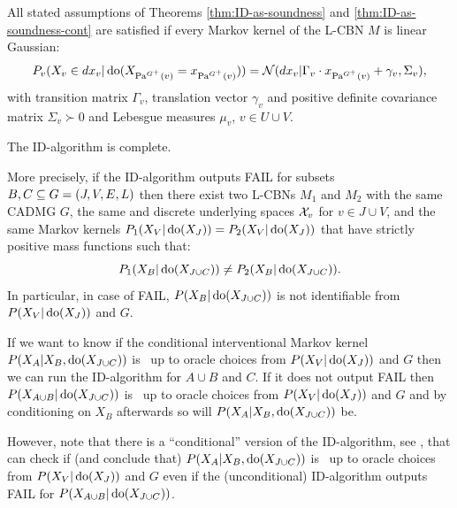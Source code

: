 \begin{Eg}
    All stated assumptions of Theorems \ref{thm:ID-as-soundness} and \ref{thm:ID-as-soundness-cont} 
    are satisfied if every Markov kernel of the L-CBN $M$ is linear Gaussian: 
    \[P_v(X_v \in dx_v|\operatorname{do}(X_{\mathrm{Pa}^{G^+}(v)}=x_{\mathrm{Pa}^{G^+}(v)})) = \mathcal{N}(dx_v|\Gamma_v \cdot x_{\mathrm{Pa}^{G^+}(v)} + \gamma_v, \Sigma_v), \] 
    with transition matrix $\Gamma_v$, translation vector $\gamma_v$ and positive definite covariance matrix $\Sigma_v \succ 0$ and Lebesgue measures $\mu_v$, $v \in U \cup V$.
\end{Eg}

\begin{Thm} 
    The ID-algorithm is complete.

    More precisely, if the ID-algorithm outputs FAIL for subsets $B, C \subseteq G=(J,V,E,L)$ 
    then there exist two L-CBNs $M_1$ and $M_2$ with the same \observational CADMG
    $G$, the same and discrete underlying spaces $\mathcal{X}_v$ for $v \in J \cup V$, and the same 
    \observational Markov kernels $P_1(X_V|\operatorname{do}(X_J)) =P_2(X_V|\operatorname{do}(X_J))$ that have strictly positive mass functions such that:
    \[ P_1(X_B|\operatorname{do}(X_{J \cup C})) \neq P_2(X_B|\operatorname{do}(X_{J \cup C})). \]
    In particular, in case of FAIL, $P(X_B|\operatorname{do}(X_{J \cup C}))$ is not identifiable from $P(X_V|\operatorname{do}(X_J))$ and $G$.
\end{Thm}


\begin{Rem} 
    If we want to know if the conditional interventional Markov kernel $P(X_A|X_B,\operatorname{do}(X_{J \cup C}))$
    is \trackable\ up to oracle choices from $P(X_V|\operatorname{do}(X_J))$ and $G$ then we can run the ID-algorithm
    for $A \cup B$ and $C$. If it does not output FAIL then $P(X_{A \cup B}|\operatorname{do}(X_{J \cup C}))$ 
    is \trackable\ up to oracle choices from $P(X_V|\operatorname{do}(X_J))$ and $G$ and by conditioning on $X_B$ afterwards so will 
    $P(X_A|X_B,\operatorname{do}(X_{J \cup C}))$ be.

    However, note that there is a ``conditional'' version of the ID-algorithm, see \cite{Tian04s}, 
    that can check if (and conclude that)
    $P(X_A|X_B,\operatorname{do}(X_{J \cup C}))$ is \trackable\ up to oracle choices from $P(X_V|\operatorname{do}(X_J))$ and $G$ 
    even if the (unconditional) ID-algorithm outputs FAIL for $P(X_{A \cup B}|\operatorname{do}(X_{J \cup C}))$.
\end{Rem}

